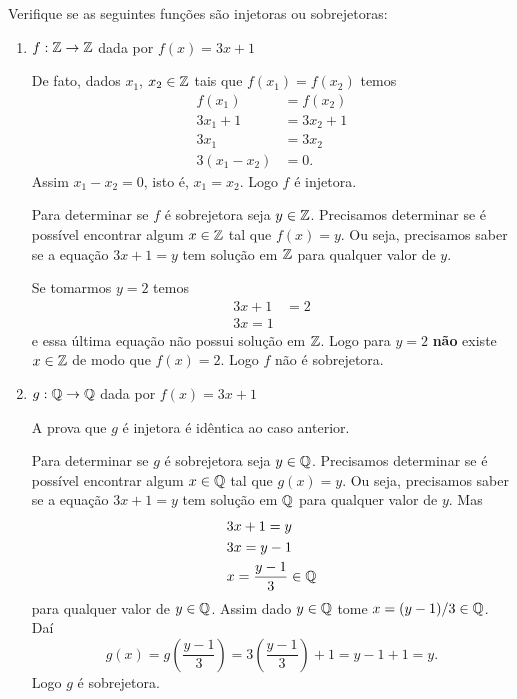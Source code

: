 \begin{exemplos}
    Verifique se as seguintes funções são injetoras ou sobrejetoras:
    \begin{enumerate}[label={\arabic*})]
        \item $f : \mathbb{Z} \to \mathbb{Z}$ dada por $f(x) = 3x + 1$
            \begin{solucao}
                De fato, dados $x_1$, $x_2 \in \mathbb{Z}$ tais que $f(x_1) = f(x_2)$ temos
                \begin{align*}
                    f(x_1) &= f(x_2)\\
                    3x_1 + 1 &= 3x_2 + 1\\
                    3x_1 &= 3x_2\\
                    3(x_1 - x_2) &= 0.
                \end{align*}
                Assim $x_1 - x_2 = 0$, isto é, $x_1 = x_2$. Logo $f$ é injetora.

                Para determinar se $f$ é sobrejetora seja $y \in \mathbb{Z}$. Precisamos determinar se é possível encontrar algum $x \in \mathbb{Z}$ tal que $f(x) = y$. Ou seja, precisamos saber se a equação $3x + 1 = y$ tem solução em $\mathbb{Z}$ para qualquer valor de $y$.

                Se tomarmos $y = 2$ temos
                \begin{align*}
                    3x + 1 &= 2\\
                    3x = 1
                \end{align*}
                e essa última equação não possui solução em $\mathbb{Z}$. Logo para $y = 2$ \textbf{não} existe $x \in \mathbb{Z}$ de modo que $f(x) = 2$. Logo $f$ não é sobrejetora.
            \end{solucao}

        \item $g : \mathbb{Q} \to \mathbb{Q}$ dada por $f(x) = 3x + 1$
            \begin{solucao}
                A prova que $g$ é injetora é idêntica ao caso anterior.

                Para determinar se $g$ é sobrejetora seja $y \in \mathbb{Q}$. Precisamos determinar se é possível encontrar algum $x \in \mathbb{Q}$ tal que $g(x) = y$. Ou seja, precisamos saber se a equação $3x + 1 = y$ tem solução em $\mathbb{Q}$ para qualquer valor de $y$. Mas
                \begin{align*}
                    &3x + 1 = y\\
                    &3x = y - 1\\
                    &x = \dfrac{y - 1}{3} \in \mathbb{Q}
                \end{align*}
                para qualquer valor de $y \in \mathbb{Q}$. Assim dado $y \in \mathbb{Q}$ tome $x = (y - 1)/3 \in \mathbb{Q}$. Daí
                \[
                    g(x) = g\left(\dfrac{y - 1}{3}\right) = 3\left(\dfrac{y - 1}{3}\right) + 1 = y - 1 + 1 = y.
                \]
                Logo $g$ é sobrejetora.
            \end{solucao}


\end{enumerate}
\end{exemplos}
